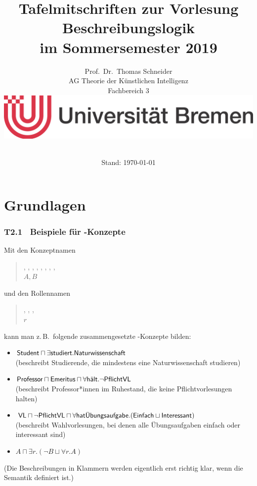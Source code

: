 \documentclass[fontsize=11pt, twoside=false, numbers=autoenddot]{scrbook}
\title{Tafelmitschriften zur Vorlesung \glqq Beschreibungslogik\grqq\\ im Sommersemester 2019}
\author{%
  Prof.\ Dr.\ Thomas Schneider\\[1pt]
  AG Theorie der Künstlichen Intelligenz \\[1pt]
  Fachbereich 3 \\
  \includegraphics[width=.4\linewidth]{logo_ub.jpg} \\[\baselineskip]~%
}
\date{Stand: \today}
\begin{document}
\maketitle
\tableofcontents

\part{Grundlagen}

\section*{T2.1~ Beispiele für {\boldmath \ALC}-Konzepte}

Mit den Konzeptnamen
%
\parI
\begin{quote}
  , , , ,
  , , , \mbox{},\\
  $A,B$
\end{quote}
%
\parI
und den Rollennamen
%
\parI
\begin{quote}
  , , ,\\
  $r$
\end{quote} 
%
\parI
kann man z.\,B.\ folgende zusammengesetzte \ALC-Konzepte bilden:
%
\parI
\begin{itemize}
  \item
    $\textsf{Student} \sqcap \exists\textsf{studiert}.\textsf{Naturwissenschaft}$ \\
    (beschreibt Studierende, die mindestens eine Naturwissenschaft studieren)
    \parI
  \item
    $\textsf{Professor} \sqcap \textsf{Emeritus} \sqcap \forall\textsf{hält}.\lnot\textsf{PflichtVL}$ \\
    (beschreibt Professor*innen im Ruhestand, die keine Pflichtvorlesungen halten)
    \parI
  \item 
    $\textsf{VL} \sqcap \lnot\textsf{PflichtVL} \sqcap \forall\textsf{hatÜbungsaufgabe}.(\textsf{Einfach} \sqcup \textsf{Interessant})$ \\
    (beschreibt Wahlvorlesungen, bei denen alle Übungsaufgaben einfach oder interessant sind)
    \parI
  \item
    $A \sqcap \exists r.(\lnot B \sqcup \forall r.A)$
\end{itemize}
%
\parI
(Die Beschreibungen in Klammern werden eigentlich erst richtig klar, wenn die Semantik definiert ist.)
\end{document}
